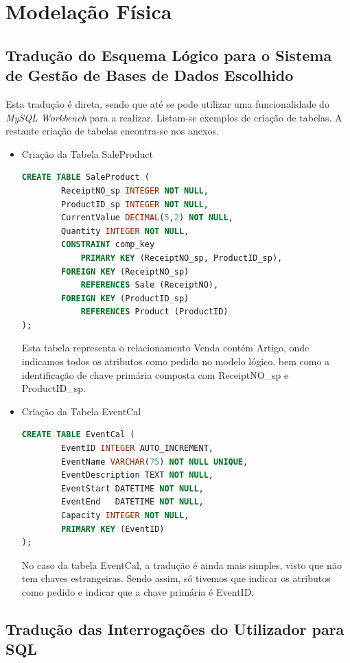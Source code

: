 \documentclass[a4paper,12pt]{scrreprt}
\begin{document}
\section{Modelação Física}
\subsection{Tradução do Esquema Lógico para o Sistema de Gestão de Bases de Dados Escolhido}
Esta tradução é direta, sendo que até se pode utilizar uma funcionalidade do \textit{MySQL Workbench} para a realizar.
Listam-se exemplos de criação de tabelas. A restante criação de tabelas encontra-se nos anexos.
\begin{itemize}
    \item{Criação da Tabela SaleProduct}
        \begin{lstlisting}[language=sql]
CREATE TABLE SaleProduct (
        ReceiptNO_sp INTEGER NOT NULL,
        ProductID_sp INTEGER NOT NULL,
        CurrentValue DECIMAL(5,2) NOT NULL,
        Quantity INTEGER NOT NULL,
        CONSTRAINT comp_key 
            PRIMARY KEY (ReceiptNO_sp, ProductID_sp),
        FOREIGN KEY (ReceiptNO_sp)
            REFERENCES Sale (ReceiptNO),
        FOREIGN KEY (ProductID_sp)
            REFERENCES Product (ProductID)
);
        \end{lstlisting}
        Esta tabela representa o relacionamento Venda contém Artigo, onde indicamos todos os atributos como pedido no modelo lógico, bem como a identificação de chave primária composta com ReceiptNO\_sp e ProductID\_sp.
    \item{Criação da Tabela EventCal}
        \begin{lstlisting}[language=sql]
CREATE TABLE EventCal (
        EventID INTEGER AUTO_INCREMENT,
        EventName VARCHAR(75) NOT NULL UNIQUE,
        EventDescription TEXT NOT NULL,
        EventStart DATETIME NOT NULL,
        EventEnd   DATETIME NOT NULL,
        Capacity INTEGER NOT NULL,
        PRIMARY KEY (EventID)
);
        \end{lstlisting}
        No caso da tabela EventCal, a tradução é ainda mais simples, visto que não tem chaves estrangeiras. Sendo assim, 
        só tivemos que indicar os atributos como pedido e indicar que a chave primária é EventID.
\end{itemize}

\subsection{Tradução das Interrogações do Utilizador para SQL} 
\end{document}
